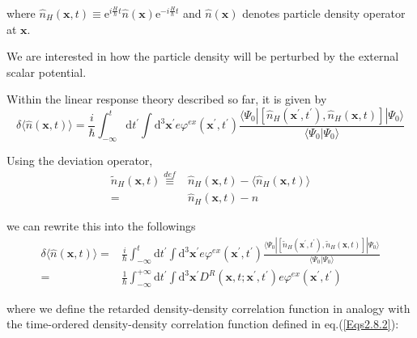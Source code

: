 where $\hat{n}_H(\mathbf{x},t) \equiv \mathrm{e}^{i \frac{H}{\hbar} t}\hat{n}(\mathbf{x})\mathrm{e}^{-i \frac{H}{\hbar}t}$ and $\hat{n}(\mathbf{x})$ denotes particle density operator at $\mathbf{x}$.

We are interested in how the particle density will be perturbed by the external scalar potential.

Within the linear response theory described so far, it is given by
\[\delta \langle \hat{n}(\mathbf{x},t) \rangle = \frac{i}{\hbar} \int_{-\infty}^{t}\mathrm{d} t^{'} \int \mathrm{d}^3 \mathbf{x}^{'} e \varphi^{ex}(\mathbf{x}^{'},t^{'}) \frac{\langle \Psi_0 | \left[ \hat{n}_{H}(\mathbf{x}^{'},t^{'}), \hat{n}_H(\mathbf{x},t) \right] | \Psi_0 \rangle}{\langle \Psi_0 | \Psi_0 \rangle}\]

Using the deviation operator,
\begin{equation} \label{Eqs3.1.11} \begin{split}
\tilde{n}_H (\mathbf{x},t) \overset{def}{\equiv}& \hat{n}_H(\mathbf{x},t) - \langle \hat{n}_H(\mathbf{x},t) \rangle\\
=& \hat{n}_H(\mathbf{x},t) - n
\end{split}\end{equation}

we can rewrite this into the followings
\begin{equation} \label{Eqs3.1.12} \begin{split}
\delta \langle \hat{n}(\mathbf{x},t) \rangle =& \frac{i}{\hbar} \int_{-\infty}^{t}\mathrm{d} t^{'} \int \mathrm{d}^3 \mathbf{x}^{'} e \varphi^{ex}(\mathbf{x}^{'},t^{'}) \frac{\langle \Psi_0 | \left[ \tilde{n}_{H}(\mathbf{x}^{'},t^{'}), \tilde{n}_H(\mathbf{x},t) \right] | \Psi_0 \rangle}{\langle \Psi_0 | \Psi_0 \rangle}\\
=& \frac{1}{\hbar} \int_{-\infty}^{+\infty} \mathrm{d}t^{'} \int \mathrm{d}^3 \mathbf{x}^{'} D^R(\mathbf{x},t;\mathbf{x}^{'},t^{'}) e \varphi^{ex}(\mathbf{x}^{'},t^{'})
\end{split}\end{equation}

where we define the retarded density-density correlation function in analogy with the time-ordered density-density correlation function defined in eq.(\ref{Eqs2.8.2}):

